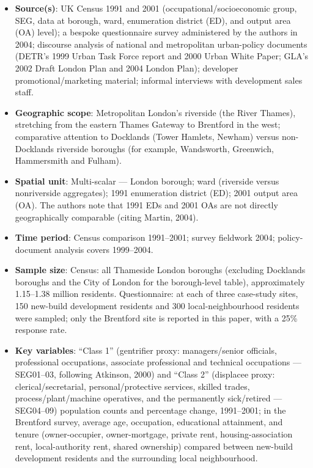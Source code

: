 \begin{itemize}
  \item \textbf{Source(s)}: UK Census 1991 and 2001 (occupational/socioeconomic group, SEG, data at borough, ward, enumeration district (ED), and output area (OA) level); a bespoke questionnaire survey administered by the authors in 2004; discourse analysis of national and metropolitan urban-policy documents (DETR's 1999 Urban Task Force report and 2000 Urban White Paper; GLA's 2002 Draft London Plan and 2004 London Plan); developer promotional/marketing material; informal interviews with development sales staff.
  \item \textbf{Geographic scope}: Metropolitan London's riverside (the River Thames), stretching from the eastern Thames Gateway to Brentford in the west; comparative attention to Docklands (Tower Hamlets, Newham) versus non-Docklands riverside boroughs (for example, Wandsworth, Greenwich, Hammersmith and Fulham).
  \item \textbf{Spatial unit}: Multi-scalar --- London borough; ward (riverside versus nonriverside aggregates); 1991 enumeration district (ED); 2001 output area (OA). The authors note that 1991 EDs and 2001 OAs are not directly geographically comparable (citing Martin, 2004).
  \item \textbf{Time period}: Census comparison 1991--2001; survey fieldwork 2004; policy-document analysis covers 1999--2004.
  \item \textbf{Sample size}: Census: all Thameside London boroughs (excluding Docklands boroughs and the City of London for the borough-level table), approximately 1.15--1.38 million residents. Questionnaire: at each of three case-study sites, 150 new-build development residents and 300 local-neighbourhood residents were sampled; only the Brentford site is reported in this paper, with a 25\% response rate.
  \item \textbf{Key variables}: ``Class 1'' (gentrifier proxy: managers/senior officials, professional occupations, associate professional and technical occupations --- SEG01--03, following Atkinson, 2000) and ``Class 2'' (displacee proxy: clerical/secretarial, personal/protective services, skilled trades, process/plant/machine operatives, and the permanently sick/retired --- SEG04--09) population counts and percentage change, 1991--2001; in the Brentford survey, average age, occupation, educational attainment, and tenure (owner-occupier, owner-mortgage, private rent, housing-association rent, local-authority rent, shared ownership) compared between new-build development residents and the surrounding local neighbourhood.

\end{itemize}

